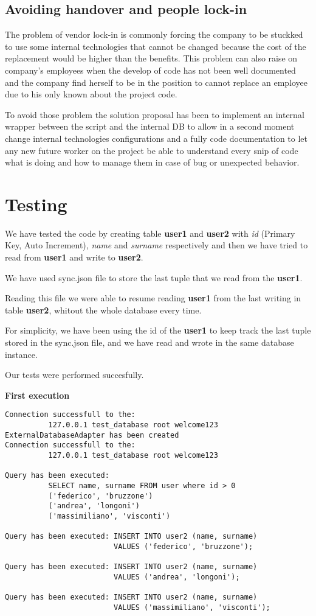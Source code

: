 \subsection{Avoiding handover and people lock-in}

The problem of vendor lock-in is commonly forcing the company to be stuckked to use some internal technologies that cannot be changed because the cost of the replacement would be higher than the benefits. This problem can also raise on company’s employees when the develop of code has not been well documented and the company find herself to be in the position to cannot replace an employee due to his only known about the project code.

To avoid those problem the solution proposal has been to implement an internal wrapper between the script and the internal DB to allow in a second moment change internal technologies configurations and a fully code documentation to let any new future worker on the project be able to understand every snip of code what is doing and how to manage them in case of bug or unexpected behavior.

\section{Testing}

We have tested the code by creating table \textbf{user1} and \textbf{user2} with \textit{id} (Primary Key, Auto Increment), \textit{name} and \textit{surname} respectively and then we have tried to read from \textbf{user1} and write to \textbf{user2}.

We have used sync.json file to store the last tuple that we read from the \textbf{user1}.

Reading this file we were able to resume reading \textbf{user1} from the last writing in table \textbf{user2}, whitout the whole database every time.

For simplicity, we have been using the id of the \textbf{user1} to keep track the last tuple stored in the sync.json file, and we have read and wrote in the same database instance.

Our tests were performed succesfully.


\textbf{First execution}
\begin{lstlisting}
Connection successfull to the: 
          127.0.0.1 test_database root welcome123 
ExternalDatabaseAdapter has been created
Connection successfull to the: 
          127.0.0.1 test_database root welcome123 

Query has been executed: 
          SELECT name, surname FROM user where id > 0
          ('federico', 'bruzzone')
          ('andrea', 'longoni')
          ('massimiliano', 'visconti')

Query has been executed: INSERT INTO user2 (name, surname) 
                         VALUES ('federico', 'bruzzone');

Query has been executed: INSERT INTO user2 (name, surname) 
                         VALUES ('andrea', 'longoni');

Query has been executed: INSERT INTO user2 (name, surname) 
                         VALUES ('massimiliano', 'visconti');
\end{lstlisting}


